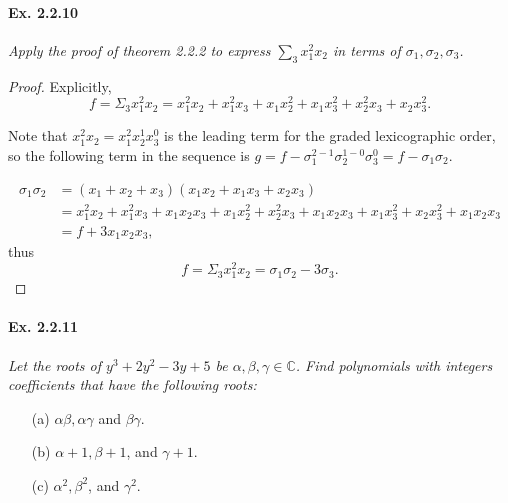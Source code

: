 \documentclass[11pt,a4paper]{article}
\newcommand{\C}{\mathbb{C}}
\begin{document}
\paragraph{Ex. 2.2.10}

{\it Apply the proof of theorem 2.2.2 to express $\sum_3 x_1^2x_2$ in terms of $\sigma_1, \sigma_2, \sigma_3$.
}

\begin{proof} Explicitly, 
$$f = \Sigma_3 x_1^2 x_2 = x_1^2x_2+x_1^2 x_3 + x_1 x_2^2+x_1 x_3^2 +x_2^2x_3+x_2 x_3^2.$$

Note that $x_1^2 x_2 = x_1^2 x_2^1 x_3^0$ is the leading term for the graded lexicographic order, so the following term in the sequence is $g = f - \sigma_1^{2-1} \sigma_2^{1-0} \sigma_3^0 = f - \sigma_1 \sigma_2$.

\begin{align*}
\sigma_1 \sigma_2 &= (x_1+x_2+x_3) (x_1 x_2+x_1x_3+x_2x_3)\\
&= x_1^2x_2 + x_1^2 x_3+x_1x_2x_3+x_1x_2^2+x_2^2x_3+x_1x_2x_3+x_1x_3^2+x_2x_3^2+x_1x_2x_3\\
&=f+ 3x_1x_2x_3,
\end{align*}
thus
$$f = \Sigma_3 x_1^2 x_2  = \sigma_1\sigma_2 - 3 \sigma_3.$$
\end{proof}

\paragraph{Ex. 2.2.11}

{\it Let the roots of $y^3+2y^2-3y+5$ be $\alpha,\beta,\gamma \in \C$. Find polynomials with integers coefficients that have the following roots:
\begin{enumerate}
\item[(a)] $\alpha \beta, \alpha \gamma$ and $\beta \gamma$.
\item[(b)] $\alpha +1, \beta + 1$, and $\gamma +1$.
\item[(c)] $\alpha^2, \beta^2$, and $\gamma^2$.
\end{enumerate}
}
\end{document}
